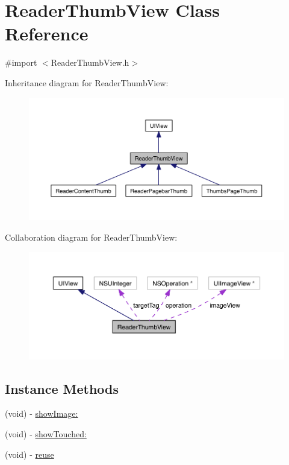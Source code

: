 \hypertarget{interface_reader_thumb_view}{\section{Reader\-Thumb\-View Class Reference}
\label{d8/d25/interface_reader_thumb_view}
}


{\ttfamily \#import $<$Reader\-Thumb\-View.\-h$>$}



Inheritance diagram for Reader\-Thumb\-View\-:
\nopagebreak
\begin{figure}[H]
\begin{center}
\leavevmode
\includegraphics[width=350pt]{d0/d0b/interface_reader_thumb_view__inherit__graph}
\end{center}
\end{figure}


Collaboration diagram for Reader\-Thumb\-View\-:
\nopagebreak
\begin{figure}[H]
\begin{center}
\leavevmode
\includegraphics[width=350pt]{d8/d71/interface_reader_thumb_view__coll__graph}
\end{center}
\end{figure}
\subsection*{Instance Methods}
\begin{DoxyCompactItemize}
\item 
(void) -\/ \hyperlink{interface_reader_thumb_view_a1e9c86de1b2fb76e3c56f2f5d7cfb953}{show\-Image\-:}
\item 
(void) -\/ \hyperlink{interface_reader_thumb_view_aacce43068c79a55abcbda4ef7188c3ba}{show\-Touched\-:}
\item 
(void) -\/ \hyperlink{interface_reader_thumb_view_a747633c2aba05254b667d2e346e083e1}{reuse}
\end{DoxyCompactItemize}
